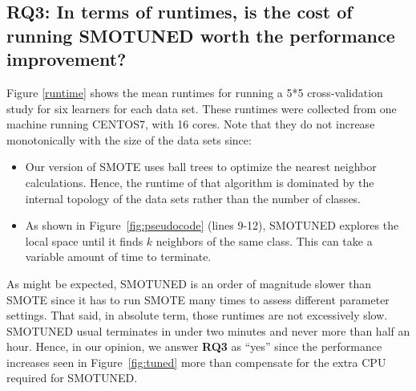 \documentclass[10pt,conference]{IEEEtran}
\newcommand{\bi}{\begin{itemize}[leftmargin=0.4cm]}
\newcommand{\ei}{\end{itemize}}
\theoremstyle{break}
\theoremstyle{break}
\newcommand{\sma}{{\sc SMOTE}}
\newcommand{\smb}{{\sc SMOTUNED}}
\begin{document}
\subsection{{\bf RQ3:} In  terms  of  runtimes,  is  the  cost  of  running  {\smb} worth the performance improvement?}

Figure \ref{runtime} shows the mean runtimes
for running a 5*5 cross-validation study for six learners for each data set.
These runtimes were collected from one machine running CENTOS7, with 16 cores.
Note that they do not increase monotonically with the size of the data sets since:
\bi
\item Our version of {\sma} uses ball trees to optimize the nearest neighbor calculations. Hence, the runtime of that algorithm is dominated by the internal topology of the data sets rather than the number of classes.
\item
As shown in 
Figure~\ref{fig:pseudocode} (lines 9-12),
{\smb} explores the local space until it finds $k$ neighbors of the same class. This can take a variable amount of time to terminate.
\ei
As might be expected,  {\smb} is an order of magnitude slower than {\sma} since
it has to run {\sma} many times to assess different parameter settings.
That said, in absolute term, those runtimes are not excessively slow.
{\smb} usual terminates in under two minutes and never more than half an hour.
Hence, in  our opinion, we answer {\bf RQ3} as ``yes'' since the   performance increases
seen in Figure~\ref{fig:tuned} more than compensate for the extra CPU required for {\smb}.
 
\end{document}
